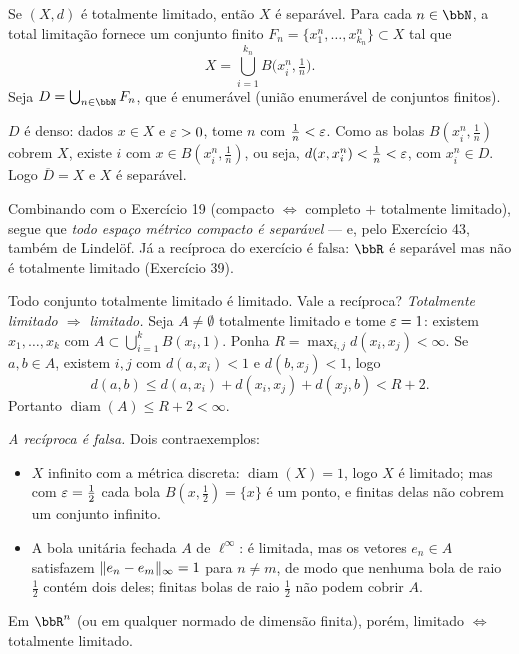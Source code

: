 \begin{exercicio}{Se $(X,d)$ é totalmente limitado, então $X$ é separável.}
\sol
Para cada $n\in\N$, a total limitação fornece um conjunto finito $F_n=\{x^n_1,\dots,x^n_{k_n}\}\subset X$ tal que
\[ X=\bigcup_{i=1}^{k_n}B\bigl(x^n_i,\tfrac1n\bigr). \]
Seja $D=\bigcup_{n\in\N}F_n$, que é enumerável (união enumerável de conjuntos finitos).

$D$ é denso: dados $x\in X$ e $\varepsilon>0$, tome $n$ com $\frac1n<\varepsilon$. Como as bolas $B(x^n_i,\frac1n)$ cobrem $X$, existe $i$ com $x\in B(x^n_i,\frac1n)$, ou seja, $d(x,x^n_i)<\frac1n<\varepsilon$, com $x^n_i\in D$. Logo $\overline{D}=X$ e $X$ é separável.

\begin{obs}
Combinando com o Exercício 19 (compacto $\iff$ completo $+$ totalmente limitado), segue que \emph{todo espaço métrico compacto é separável} --- e, pelo Exercício 43, também de Lindelöf. Já a recíproca do exercício é falsa: $\R$ é separável mas não é totalmente limitado (Exercício 39).
\end{obs}
\end{exercicio}

\begin{exercicio}{Todo conjunto totalmente limitado é limitado. Vale a recíproca?}
\sol
\emph{Totalmente limitado $\Rightarrow$ limitado.} Seja $A\neq\emptyset$ totalmente limitado e tome $\varepsilon=1$: existem $x_1,\dots,x_k$ com $A\subset\bigcup_{i=1}^kB(x_i,1)$. Ponha $R=\max_{i,j}d(x_i,x_j)<\infty$. Se $a,b\in A$, existem $i,j$ com $d(a,x_i)<1$ e $d(b,x_j)<1$, logo
\[ d(a,b)\le d(a,x_i)+d(x_i,x_j)+d(x_j,b)<R+2 . \]
Portanto $\operatorname{diam}(A)\le R+2<\infty$.

\emph{A recíproca é falsa.} Dois contraexemplos:
\begin{itemize}[leftmargin=*]
\item $X$ infinito com a métrica discreta: $\operatorname{diam}(X)=1$, logo $X$ é limitado; mas com $\varepsilon=\frac12$ cada bola $B(x,\frac12)=\{x\}$ é um ponto, e finitas delas não cobrem um conjunto infinito.
\item A bola unitária fechada $A$ de $\ell^\infty$: é limitada, mas os vetores $e_n\in A$ satisfazem $\lVert e_n-e_m\rVert_\infty=1$ para $n\neq m$, de modo que nenhuma bola de raio $\frac12$ contém dois deles; finitas bolas de raio $\frac12$ não podem cobrir $A$.
\end{itemize}
Em $\R^n$ (ou em qualquer normado de dimensão finita), porém, limitado $\iff$ totalmente limitado.
\end{exercicio}

